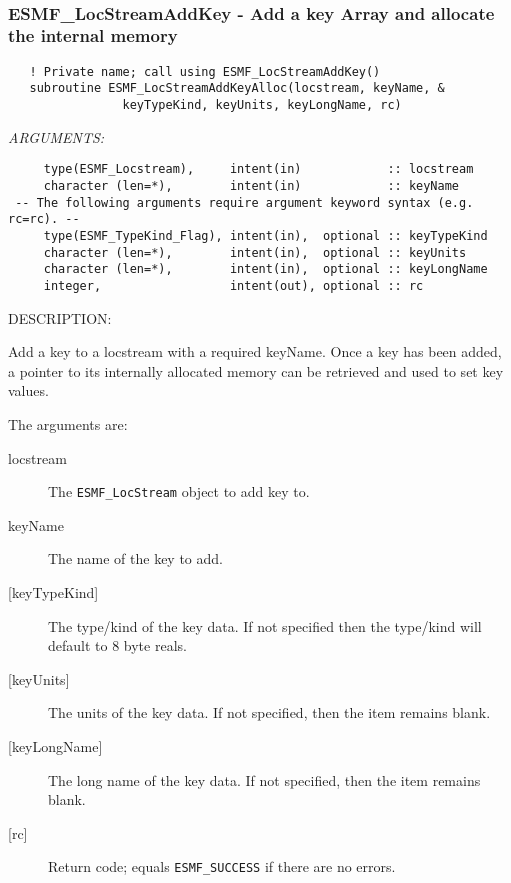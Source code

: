  
\mbox{}\hrulefill\ 
 
\subsubsection [ESMF\_LocStreamAddKey] {ESMF\_LocStreamAddKey - Add a key Array and allocate the internal memory}


 
\begin{verbatim}   ! Private name; call using ESMF_LocStreamAddKey()
   subroutine ESMF_LocStreamAddKeyAlloc(locstream, keyName, &
                keyTypeKind, keyUnits, keyLongName, rc)\end{verbatim}{\em ARGUMENTS:}
\begin{verbatim}     type(ESMF_Locstream),     intent(in)            :: locstream
     character (len=*),        intent(in)            :: keyName
 -- The following arguments require argument keyword syntax (e.g. rc=rc). --
     type(ESMF_TypeKind_Flag), intent(in),  optional :: keyTypeKind
     character (len=*),        intent(in),  optional :: keyUnits 
     character (len=*),        intent(in),  optional :: keyLongName 
     integer,                  intent(out), optional :: rc\end{verbatim}
{\sf DESCRIPTION:\\ }


   Add a key to a locstream with a required keyName. Once a key has 
   been added, a pointer to its internally allocated memory can be 
   retrieved and used to set key values. 
  
   The arguments are:
   \begin{description}
   \item [locstream]
   The {\tt ESMF\_LocStream} object to add key to.
   \item [keyName]
   The name of the key to add. 
   \item [{[keyTypeKind]}]
   The type/kind of the key data. 
   If not specified then the type/kind will default to 8 byte reals.  
   \item [{[keyUnits]}]
   The units of the key data. 
   If not specified, then the item remains blank.  
   \item [{[keyLongName]}]
   The long name of the key data. 
   If not specified, then the item remains blank.  
   \item [{[rc]}]
   Return code; equals {\tt ESMF\_SUCCESS} if there are no errors.
   \end{description} 
 
